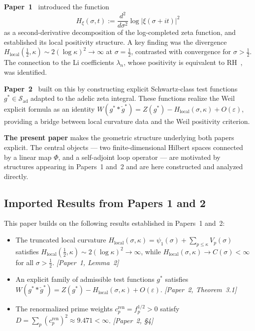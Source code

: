 \documentclass[11pt]{article}
\newcommand{\Hlocal}{H_{\mathrm{local}}}
\newcommand{\cren}{c_p^{\mathrm{ren}}}
\begin{document}
\textbf{Paper~1}~\cite{Paper1} introduced the function
\[
H_{\xi}(\sigma,t) := \frac{d^2}{d\sigma^2}\log|\xi(\sigma+it)|^2
\]
as a second-derivative decomposition of the log-completed zeta function, and
established its local positivity structure. A key finding was the divergence
$\Hlocal(\tfrac12,\kappa)\sim 2(\log\kappa)^2\to\infty$ at $\sigma=\tfrac12$, %
contrasted with convergence for $\sigma>\tfrac12$. The connection to the Li
coefficients $\lambda_n$, whose positivity is equivalent to RH~\cite{Li97},
was identified.

\textbf{Paper~2}~\cite{Paper2} built on this by constructing explicit
Schwartz-class test functions $g^*\in\mathcal{S}_{\mathrm{ad}}$ adapted
to the adelic zeta integral. These functions realize the Weil explicit formula
as an identity
$W(g^*\ast\check{g}^*)=Z(g^*)-\Hlocal(\sigma,\kappa)+O(\varepsilon)$,
providing a bridge between local curvature data and the Weil positivity
criterion.

\textbf{The present paper} makes the geometric structure underlying both
papers explicit. The central objects --- two finite-dimensional Hilbert spaces
connected by a linear map $\Phi$, and a self-adjoint loop operator ---
are motivated by structures appearing in Papers~1 and~2 and are here
constructed and analyzed directly.

\subsection{Imported Results from Papers 1 and 2}
\label{sec:imported}

This paper builds on the following results established in Papers~1 and~2:

\begin{itemize}[leftmargin=2.2em]
\item[\textbf{(R1)}] The truncated local curvature
$\Hlocal(\sigma,\kappa)=\psi_1(\sigma)+\sum_{p\le\kappa}V_p(\sigma)$ satisfies
$\Hlocal(\tfrac12,\kappa)\sim 2(\log\kappa)^2\to\infty$, while %
$\Hlocal(\sigma,\kappa)\to C(\sigma)<\infty$ for all $\sigma>\tfrac12$.
\emph{[Paper~1, Lemma~2]}

\item[\textbf{(R2)}] An explicit family of admissible test functions $g^*$
satisfies
$W(g^*\ast\check{g}^*)=Z(g^*)-\Hlocal(\sigma,\kappa)+O(\varepsilon)$.
\emph{[Paper~2, Theorem~3.1]}

\item[\textbf{(R3)}] The renormalized prime weights $\cren=f_p^{1/2}>0$ satisfy
$D=\sum_p(\cren)^2\approx 9.471<\infty$. \emph{[Paper~2, \S4]}
\end{itemize}
\end{document}
